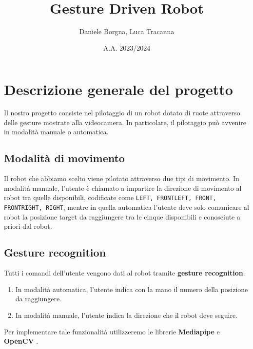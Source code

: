 \documentclass[]{article}
\title{Gesture Driven Robot}
\author{Daniele Borgna, Luca Tracanna}
\date{A.A. 2023/2024}
\begin{document}
\maketitle

\pagebreak

\tableofcontents


\pagebreak


\pagebreak
\section{Descrizione generale del progetto}
Il nostro progetto consiste nel pilotaggio di un robot dotato di ruote attraverso delle gesture mostrate alla videocamera. In particolare, il pilotaggio può avvenire in modalità manuale o automatica.
\subsection{Modalità di movimento}
Il robot che abbiamo scelto viene pilotato attraverso due tipi di movimento. In modalità manuale, l'utente è chiamato a impartire la direzione di movimento al robot tra quelle disponibili, codificate come \texttt{LEFT, FRONTLEFT, FRONT, FRONTRIGHT, RIGHT}, mentre in quella automatica l'utente deve solo comunicare al robot la posizione target da raggiungere tra le cinque disponibili e conosciute a priori dal robot.




\subsection{Gesture recognition}
Tutti i comandi dell'utente vengono dati al robot tramite \textbf{gesture recognition}.
\begin{enumerate}
    \item In modalità automatica, l'utente indica con la mano il numero della posizione da raggiungere.
    \item In modalità manuale, l'utente indica la direzione che il robot deve seguire.
\end{enumerate}
Per implementare tale funzionalità utilizzeremo le librerie \textbf{Mediapipe} \cite{mediapipe} e \textbf{OpenCV} \cite{opencv}.
\end{document}
